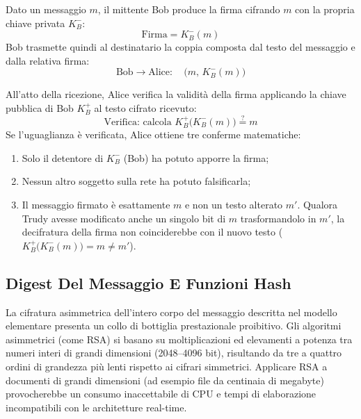 \documentclass[11pt, a4paper]{article}
\begin{document}

Dato un messaggio $m$, il mittente Bob produce la firma cifrando $m$ con la propria chiave privata $K_B^-$:
\[
\text{Firma} = K_B^-(m)
\]
Bob trasmette quindi al destinatario la coppia composta dal testo del messaggio e dalla relativa firma:
\[
\text{Bob} \longrightarrow \text{Alice}: \quad \bigl(m, \, K_B^-(m)\bigr)
\]


All'atto della ricezione, Alice verifica la validità della firma applicando la chiave pubblica di Bob $K_B^+$ al testo cifrato ricevuto:
\begin{equation}
\text{Verifica: calcola } K_B^+\bigl(K_B^-(m)\bigr) \stackrel{?}{=} m
\end{equation}
Se l'uguaglianza è verificata, Alice ottiene tre conferme matematiche:
\begin{enumerate}[noitemsep]
    \item Solo il detentore di $K_B^-$ (Bob) ha potuto apporre la firma;
    \item Nessun altro soggetto sulla rete ha potuto falsificarla;
    \item Il messaggio firmato è esattamente $m$ e non un testo alterato $m'$. Qualora Trudy avesse modificato anche un singolo bit di $m$ trasformandolo in $m'$, la decifratura della firma non coinciderebbe con il nuovo testo ($K_B^+\bigl(K_B^-(m)\bigr) = m \neq m'$).
\end{enumerate}

\subsection{Digest Del Messaggio E Funzioni Hash}

La cifratura asimmetrica dell'intero corpo del messaggio descritta nel modello elementare presenta un collo di bottiglia prestazionale proibitivo. Gli algoritmi asimmetrici (come RSA) si basano su moltiplicazioni ed elevamenti a potenza tra numeri interi di grandi dimensioni (2048--4096 bit), risultando da tre a quattro ordini di grandezza più lenti rispetto ai cifrari simmetrici. Applicare RSA a documenti di grandi dimensioni (ad esempio file da centinaia di megabyte) provocherebbe un consumo inaccettabile di CPU e tempi di elaborazione incompatibili con le architetture real-time.
\end{document}
